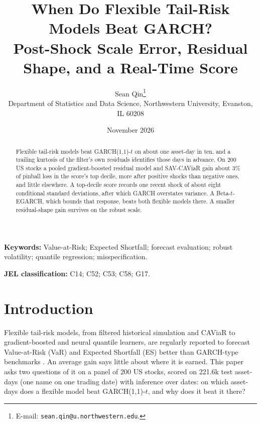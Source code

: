 \documentclass[11pt]{article}
\title{When Do Flexible Tail-Risk Models Beat GARCH?\\
\large Post-Shock Scale Error, Residual Shape, and a Real-Time Score}
\author{%
  Sean Qin\thanks{E-mail: \texttt{sean.qin@u.northwestern.edu}.}\\[4pt]
  \normalsize Department of Statistics and Data Science, Northwestern
  University, Evanston, IL 60208}
\date{November 2026}
\theoremstyle{remark}
\begin{document}
\maketitle
\let\footnote\endnote

\begin{abstract}
Flexible tail-risk models beat GARCH(1,1)-$t$ on about one asset-day in ten, and a trailing kurtosis of the filter's own residuals identifies those days in advance. On 200 US stocks a pooled gradient-boosted residual model and SAV-CAViaR gain about 3\% of pinball loss in the score's top decile, more after positive shocks than negative ones, and little elsewhere. A top-decile score records one recent shock of about eight conditional standard deviations, after which GARCH overstates variance. A Beta-$t$-EGARCH, which bounds that response, beats both flexible models there. A smaller residual-shape gain survives on the robust scale.
\end{abstract}

\noindent\textbf{Keywords:} Value-at-Risk; Expected Shortfall;
forecast evaluation; robust volatility; quantile regression; misspecification.

\medskip
\noindent\textbf{JEL classification:} C14; C52; C53; C58; G17.

\section*{Introduction}\label{sec:intro}

Flexible tail-risk models, from filtered historical simulation and CAViaR to gradient-boosted and neural quantile learners, are regularly reported to forecast Value-at-Risk (VaR) and Expected Shortfall (ES) better than GARCH-type benchmarks \citep{kuester2006, nietoruiz2016, chronopoulos2024}. An average gain says little about where it is earned. This paper asks two questions of it on a panel of 200 US stocks, scored on 221.6k test asset-days (one name on one trading date) with inference over dates: on which asset-days does a flexible model beat GARCH(1,1)-$t$, and why does it beat it there?
\end{document}
